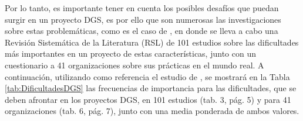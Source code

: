 Por lo tanto, es importante tener en cuenta los posibles desafíos que puedan surgir en un proyecto DGS, es por ello que son numerosas las investigaciones sobre estas problemáticas, como es el caso de \cite{niazi2016challenges}, en donde se lleva a cabo una Revisión Sistemática de la Literatura (RSL) de 101 estudios sobre las dificultades más importantes en un proyecto de estas características, junto con un cuestionario a 41 organizaciones sobre sus prácticas en el mundo real. A continuación, utilizando como referencia el estudio de \cite{niazi2016challenges}, se mostrará en la Tabla \ref{tab:DificultadesDGS} las frecuencias de importancia para las dificultades, que se deben afrontar en los proyectos DGS, en 101 estudios (tab. 3, pág. 5) y para 41 organizaciones (tab. 6, pág. 7), junto con una media ponderada de ambos valores.

